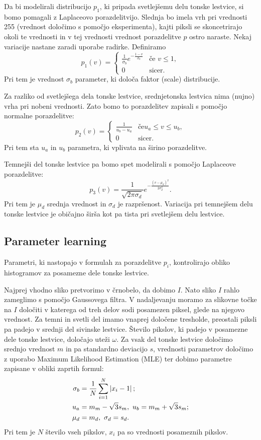 Da bi modelirali distribucijo $p_1$, ki pripada svetlejšemu delu tonske lestvice, si bomo pomagali z Laplaceovo porazdelitvijo. Slednja bo imela vrh pri vrednosti 255 (vrednost določimo s pomočjo eksperimenta), kajti piksli se skoncetrirajo okoli te vrednosti in v tej vrednosti vrednost porazdelitve $p$ ostro naraste. Nekaj variacije nastane zaradi uporabe radirke. Definiramo
$$
p_1(v) =
\begin{cases}
  \frac{1}{\sigma_b} e^{-\frac{1-v}{\sigma_b}} & \mbox{če } v \leq 1, \\
  0                                                                          & \mbox{sicer}.
\end{cases}
$$
Pri tem je vrednost $\sigma_b$ parameter, ki določa faktor (scale) distribucije.

Za razliko od svetlejšega dela tonske lestvice, srednjetonska lestvica nima (nujno) vrha pri nobeni vrednosti. Zato bomo to porazdelitev zapisali s pomočjo normalne porazdelitve:
$$
p_2(v) =
\begin{cases}
  \frac{1}{u_b - u_a} & \mbox{če} u_a \leq v \leq u_b, \\
  0                               & \mbox{sicer}.
\end{cases}
$$
Pri tem sta $u_a$ in $u_b$ parametra, ki vplivata na širino porazdelitve.

Temnejši del tonske lestvice pa bomo spet modelirali s pomočjo Laplaceove porazdelitve:
$$
p_3(v) = \frac{1}{\sqrt{2\pi \sigma_d}} e^{-\frac{(v - \mu_d)^2}{2\sigma_d^2}}.
$$
Pri tem je $\mu_d$ srednja vrednost in $\sigma_d$ je razpršenost. Variacija pri temnejšem delu tonske lestvice je običajno širša kot pa tista pri svetlejšem delu lestvice.
%
\subsection{Parameter learning}
Parametri, ki nastopajo v formulah za porazdelitve $p_i$, kontrolirajo obliko histogramov za posamezne dele tonske lestvice.

Najprej vhodno sliko pretvorimo v črnobelo, da dobimo $I$. Nato sliko $I$ rahlo zameglimo s pomočjo Gaussovega filtra. V nadaljevanju  moramo za slikovne točke na $I$ določiti v katerega od treh delov sodi posamezen piksel, glede na njegovo vrednost. Za temni in svetli del imamo vnaprej določene tresholde, preostali piksli pa padejo v srednji del sivinske lestvice. Število pikslov, ki padejo v posamezne dele tonske lestvice, določajo uteži $\omega$. Za vsak del tonske lestvice določimo srednjo vrednost $m$ in pa standardno deviacijo $s$, vrednosti parametrov določimo z uporabo Maximum Likelihood Estimation (MLE) ter dobimo parametre zapisane v obliki zaprtih formul:
%
\begin{align*}
\sigma_b & = \frac{1}{N} \sum_{i = 1}^N \left|x_i - 1\right|; \\
u_a & = m_m - \sqrt{3}s_m,\ u_b = m_m + \sqrt{3}s_m; \\
\mu_d &= m_d,\ \sigma_d = s_d.
\end{align*}
%
Pri tem je $N$ število vseh pikslov, $x_i$ pa so vrednosti posameznih pikslov.
%
